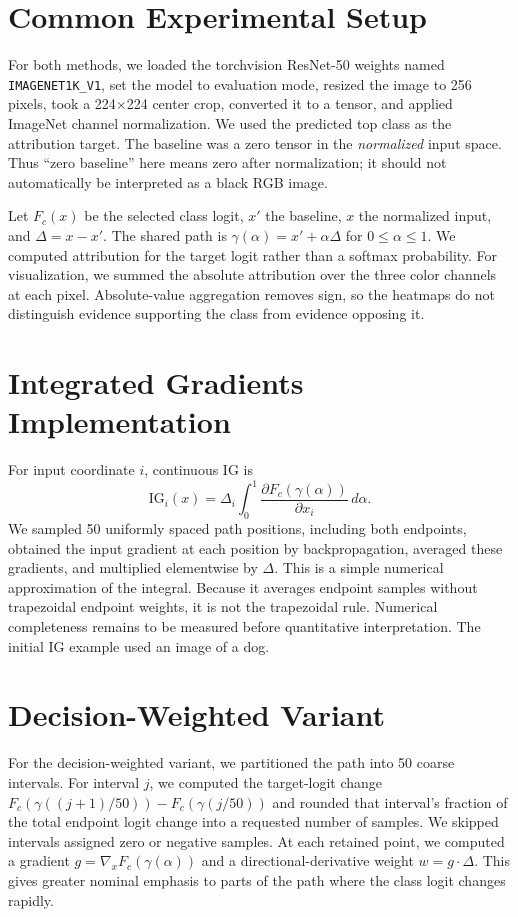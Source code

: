 \documentclass[conference]{IEEEtran}
\begin{document}
\section{Common Experimental Setup}
For both methods, we loaded the torchvision ResNet-50 weights named \texttt{IMAGENET1K\_V1}, set the model to evaluation mode, resized the image to 256 pixels, took a 224$\times$224 center crop, converted it to a tensor, and applied ImageNet channel normalization. We used the predicted top class as the attribution target. The baseline was a zero tensor in the \emph{normalized} input space. Thus ``zero baseline'' here means zero after normalization; it should not automatically be interpreted as a black RGB image.

Let $F_c(x)$ be the selected class logit, $x'$ the baseline, $x$ the normalized input, and $\Delta=x-x'$. The shared path is $\gamma(\alpha)=x'+\alpha\Delta$ for $0\leq\alpha\leq1$. We computed attribution for the target logit rather than a softmax probability. For visualization, we summed the absolute attribution over the three color channels at each pixel. Absolute-value aggregation removes sign, so the heatmaps do not distinguish evidence supporting the class from evidence opposing it.

\section{Integrated Gradients Implementation}
For input coordinate $i$, continuous IG is
\begin{equation}
\mathrm{IG}_i(x)=\Delta_i\int_0^1\frac{\partial F_c(\gamma(\alpha))}{\partial x_i}\,d\alpha.
\end{equation}
We sampled 50 uniformly spaced path positions, including both endpoints, obtained the input gradient at each position by backpropagation, averaged these gradients, and multiplied elementwise by $\Delta$. This is a simple numerical approximation of the integral. Because it averages endpoint samples without trapezoidal endpoint weights, it is not the trapezoidal rule. Numerical completeness remains to be measured before quantitative interpretation. The initial IG example used an image of a dog.

\section{Decision-Weighted Variant}
For the decision-weighted variant, we partitioned the path into 50 coarse intervals. For interval $j$, we computed the target-logit change $F_c(\gamma((j+1)/50))-F_c(\gamma(j/50))$ and rounded that interval's fraction of the total endpoint logit change into a requested number of samples. We skipped intervals assigned zero or negative samples. At each retained point, we computed a gradient $g=\nabla_xF_c(\gamma(\alpha))$ and a directional-derivative weight $w=g\cdot\Delta$. This gives greater nominal emphasis to parts of the path where the class logit changes rapidly.
\end{document}

